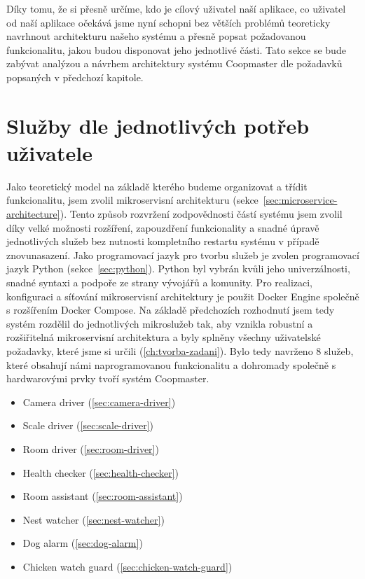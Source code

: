 Díky tomu, že si přesně určíme, kdo je cílový uživatel naší aplikace, co uživatel od naší aplikace očekává jsme  nyní schopni bez větších problémů teoreticky navrhnout architekturu našeho systému a přesně popsat požadovanou funkcionalitu, jakou budou disponovat jeho jednotlivé části.
Tato sekce se bude zabývat analýzou a návrhem architektury systému Coopmaster dle požadavků popsaných v předchozí kapitole.

\section{Služby dle jednotlivých potřeb uživatele}\label{sec:microservices}
Jako teoretický model na základě kterého budeme organizovat a třídit funkcionalitu, jsem zvolil mikroservisní architekturu (sekce~\ref{sec:microservice-architecture}).
Tento způsob rozvržení zodpovědnosti částí systému jsem zvolil díky velké možnosti rozšíření, zapouzdření funkcionality a snadné úpravě jednotlivých služeb bez nutnosti kompletního restartu systému v případě znovunasazení.\newline
Jako programovací jazyk pro tvorbu služeb je zvolen programovací jazyk Python (sekce~\ref{sec:python}).
Python byl vybrán kvůli jeho univerzálnosti, snadné syntaxi a podpoře ze strany vývojářů a komunity.\newline
Pro realizaci, konfiguraci a síťování mikroservisní architektury je použit Docker Engine společně s rozšířením Docker Compose.\newline
Na základě předchozích rozhodnutí jsem tedy systém rozdělil do jednotlivých mikroslužeb tak, aby vznikla robustní a rozšiřitelná mikroservisní architektura a byly splněny všechny uživatelské požadavky, které jsme si určili (\ref{ch:tvorba-zadani}).\newline
Bylo tedy navrženo 8 služeb, které obsahují námi naprogramovanou funkcionalitu a dohromady společně s hardwarovými prvky tvoří systém Coopmaster.
\begin{itemize}
    \item Camera driver (\ref{sec:camera-driver})
    \item Scale driver (\ref{sec:scale-driver})
    \item Room driver (\ref{sec:room-driver})
    \item Health checker (\ref{sec:health-checker})
    \item Room assistant (\ref{sec:room-assistant})
    \item Nest watcher (\ref{sec:nest-watcher})
    \item Dog alarm (\ref{sec:dog-alarm})
    \item Chicken watch guard (\ref{sec:chicken-watch-guard})
\end{itemize}

